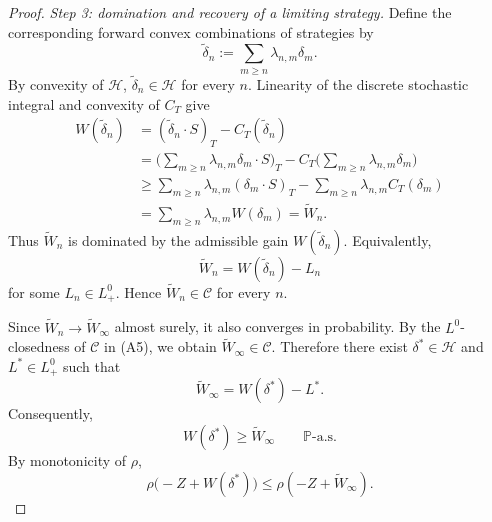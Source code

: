 \documentclass[11pt,a4paper]{report}
\numberwithin{equation}{chapter}
\theoremstyle{plain}
\theoremstyle{definition}
\newcommand{\PP}{\mathbb{P}}
\newcommand{\HH}{\mathcal{H}}
\newcommand{\CC}{\mathcal{C}}
\begin{document}
\begin{proof}
    \emph{Step 3: domination and recovery of a limiting strategy.}
    Define the corresponding forward convex combinations of strategies by
    \[
        \widetilde\delta_n:=\sum_{m\ge n}\lambda_{n,m}\delta_m.
    \]
    By convexity of $\HH$, $\widetilde\delta_n\in\HH$ for every $n$. Linearity of the discrete stochastic integral and convexity of $C_T$ give
    \begin{equation}\label{eq:domination}
        \begin{aligned}
            W(\widetilde\delta_n) & =(\widetilde\delta_n\cdot S)_T-C_T(\widetilde\delta_n)                                                 \\
                                  & =\Big(\sum_{m\ge n}\lambda_{n,m}\delta_m\cdot S\Big)_T-C_T\Big(\sum_{m\ge n}\lambda_{n,m}\delta_m\Big) \\
                                  & \ge\sum_{m\ge n}\lambda_{n,m}(\delta_m\cdot S)_T-\sum_{m\ge n}\lambda_{n,m}C_T(\delta_m)               \\
                                  & =\sum_{m\ge n}\lambda_{n,m}W(\delta_m)=\widetilde W_n.
        \end{aligned}
    \end{equation}
    Thus $\widetilde W_n$ is dominated by the admissible gain $W(\widetilde\delta_n)$. Equivalently,
    \[
        \widetilde W_n=W(\widetilde\delta_n)-L_n
    \]
    for some $L_n\in L^0_+$. Hence $\widetilde W_n\in\CC$ for every $n$.

    Since $\widetilde W_n\to\widetilde W_\infty$ almost surely, it also converges in probability. By the $L^0$-closedness of $\CC$ in (A5), we obtain $\widetilde W_\infty\in\CC$. Therefore there exist $\delta^*\in\HH$ and $L^*\in L^0_+$ such that
    \[
        \widetilde W_\infty=W(\delta^*)-L^*.
    \]
    Consequently,
    \begin{equation}\label{eq:dominating-strategy}
        W(\delta^*)\ge\widetilde W_\infty\qquad\PP\text{-a.s.}
    \end{equation}
    By monotonicity of $\rho$,
    \begin{equation}\label{eq:monotone-step}
        \rho\bigl(-Z+W(\delta^*)\bigr)\le\rho(-Z+\widetilde W_\infty).
    \end{equation}


\end{proof}
\end{document}
